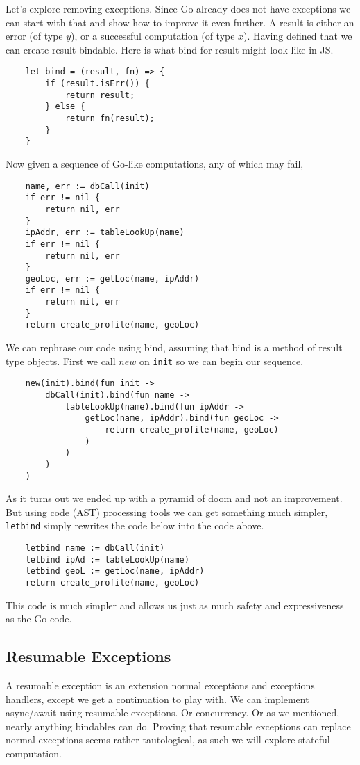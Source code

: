 Let's explore removing exceptions.
Since Go already does not have exceptions
we can start with that and show how to improve it even further.
A result is either an error (of type $y$),
or a successful computation (of type $x$).
Having defined that we can create result bindable.
Here is what bind for result might look like in JS.
\begin{verbatim}
    let bind = (result, fn) => {
        if (result.isErr()) {
            return result;
        } else {
            return fn(result);
        }
    }
\end{verbatim}
Now given a sequence of Go-like computations,
any of which may fail,
\begin{verbatim}
    name, err := dbCall(init)
    if err != nil {
        return nil, err
    }
    ipAddr, err := tableLookUp(name)
    if err != nil {
        return nil, err
    }
    geoLoc, err := getLoc(name, ipAddr)
    if err != nil {
        return nil, err
    }
    return create_profile(name, geoLoc)
\end{verbatim}
We can rephrase our code using bind,
assuming that bind is a method of result type objects.
First we call $new$ on \texttt{init} so we can begin our
sequence.
\begin{verbatim}
    new(init).bind(fun init ->
        dbCall(init).bind(fun name ->
            tableLookUp(name).bind(fun ipAddr ->
                getLoc(name, ipAddr).bind(fun geoLoc ->
                    return create_profile(name, geoLoc)
                )
            )
        )
    )
\end{verbatim}
As it turns out we ended up with a pyramid of doom and not an improvement.
But using code (AST) processing tools we can get something much simpler,
\texttt{letbind} simply rewrites the code below into the code above.
\begin{verbatim}
    letbind name := dbCall(init)
    letbind ipAd := tableLookUp(name)
    letbind geoL := getLoc(name, ipAddr)
    return create_profile(name, geoLoc)
\end{verbatim}
This code is much simpler and allows us just as much
safety and expressiveness as the Go code.

\subsection{Resumable Exceptions}
A resumable exception is an extension normal exceptions
and exceptions handlers, except we get a continuation to play with.
We can implement async/await using resumable exceptions.
Or concurrency. Or as we mentioned, nearly
anything bindables can do.
Proving that resumable exceptions can replace normal
exceptions seems rather tautological,
as such we will explore stateful computation.

